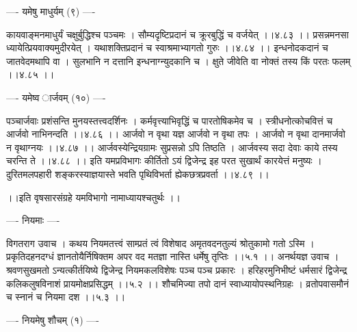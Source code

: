 \documentclass[11pt]{book}
\begin{document}
\begin{landscape}
---- यमेषु माधुर्यम् (९) ----

कायवाङ्मनमाधुर्यं चक्षुर्बुद्धिश्च पञ्चमः ।
सौम्यदृष्टिप्रदानं च क्रूरबुद्धिं च वर्जयेत् ।।४.८३ ।।
प्रसन्नमनसा ध्यायेत्प्रियवाक्यमुदीरयेत् ।
यथाशक्तिप्रदानं च स्वाश्रमाभ्यागतो गुरुः ।।४.८४ ।।
इन्धनोदकदानं च जातवेदमथापि वा ।
सुलभानि न दत्तानि इन्धनाग्न्युदकानि च ।
क्षुते जीवेति वा नोक्तं तस्य किं परतः फलम् ।।४.८५ ।।

---- यमेष्व{ }ार्जवम् (१०) ----

पञ्चार्जवाः प्रशंसन्ति मुनयस्तत्त्वदर्शिनः ।
कर्मवृत्त्याभिवृद्धिं च पारतोषिकमेव च ।
स्त्रीधनोत्कोचवित्तं च आर्जवो नाभिनन्दति ।।४.८६ ।।
आर्जवो न वृथा यज्ञ आर्जवो न वृथा तपः ।
आर्जवो न वृथा दानमार्जवो न वृथाग्नयः ।।४.८७ ।।
आर्जवस्येन्द्रियग्रामः सुप्रसन्नो ऽपि तिष्ठति ।
आर्जवस्य सदा देवाः काये तस्य चरन्ति ते ।।४.८८ ।।
इति यमप्रविभागः कीर्तितो ऽयं द्विजेन्द्र
इह परत सुखार्थं कारयेत्तं मनुष्यः ।
दुरितमलपहारी शङ्करस्याज्ञयास्ते
भवति पृथिविभर्ता ह्येकछत्रप्रवर्ता ।।४.८९ ।।

 ।।इति वृषसारसंग्रहे यमविभागो नामाध्यायश्चतुर्थः ।।





---- नियमाः ----

विगतराग उवाच ।
कथय नियमतत्त्वं साम्प्रतं त्वं विशेषाद
अमृतवदनतुल्यं श्रोतुकामो गतो ऽस्मि ।
प्रकृतिदहनदग्धं ज्ञानतोयैर्निषिक्तम
अपर वद मतज्ञा नास्ति धर्मेषु तृप्तिः ।।५.१ ।।
अनर्थयज्ञ उवाच ।
श्रवणसुखमतो ऽन्यत्कीर्तयिष्ये द्विजेन्द्र
नियमकलविशेषः पञ्च पञ्च प्रकारः ।
हरिहरमुनिभीष्टं धर्मसारं द्विजेन्द्र
कलिकलुषविनाशं प्रायमोक्षप्रसिद्धम् ।।५.२ ।।
शौचमिज्या तपो दानं स्वाध्यायोपस्थनिग्रहः ।
व्रतोपवासमौनं च स्नानं च नियमा दश ।।५.३ ।।

---- नियमेषु शौचम् (१) ----


\end{landscape}
\end{document}
